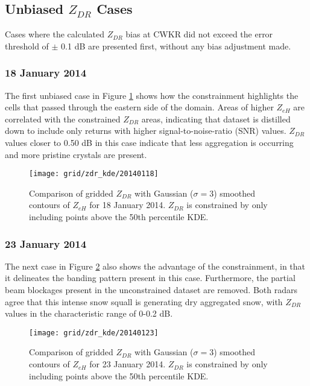 \subsection{Unbiased $Z_{DR}$ Cases}
Cases where the calculated $Z_{DR}$ bias at CWKR did not exceed the error threshold of $\pm$ 0.1 dB are presented first, without any bias adjustment made.
\subsubsection{18 January 2014}
The first unbiased case in Figure \ref{fig:grid_zdr_kde_20140118} shows how the constrainment highlights the cells that passed through the eastern side of
the domain. Areas of higher $Z_{eH}$  are correlated with the constrained $Z_{DR}$ areas, indicating that dataset is distilled down to include only returns
with higher signal-to-noise-ratio (SNR) values. $Z_{DR}$ values closer to 0.50 dB in this case indicate that less aggregation is occurring and more pristine
crystals are present.
\begin{figure}[H]
\texttt{[image: grid/zdr\_kde/20140118]}
\caption{Comparison of gridded $Z_{DR}$ with Gaussian ($\sigma=3$) smoothed contours of $Z_{eH}$ for 18 January 2014. $Z_{DR}$ is constrained by only including points above the 50th percentile KDE.}
\label{fig:grid_zdr_kde_20140118}
\end{figure}
\subsubsection{23 January 2014}
The next case in Figure \ref{fig:grid_zdr_kde_20140123} also shows the advantage of the constrainment, in that it delineates the banding pattern present in this case. Furthermore, the partial beam blockages present in the unconstrained dataset are removed. Both radars agree that this intense snow
squall is generating dry aggregated snow, with $Z_{DR}$ values in the characteristic range of 0-0.2 dB.
\begin{figure}[H]
\texttt{[image: grid/zdr\_kde/20140123]}
\caption{Comparison of gridded $Z_{DR}$ with Gaussian ($\sigma=3$) smoothed contours of $Z_{eH}$ for 23 January 2014. $Z_{DR}$ is constrained by only including points above the 50th percentile KDE.} 
\label{fig:grid_zdr_kde_20140123}
\end{figure}
